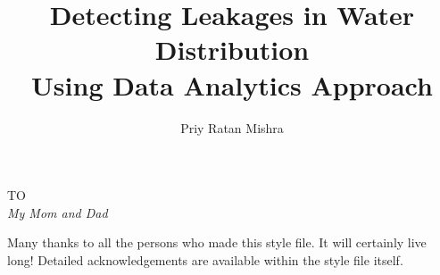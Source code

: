 \documentclass[12pt]{iiscthes}
\begin{document}
\begin{frontmatter}
%
%

\title{Detecting Leakages in Water Distribution\\ 
	Using Data Analytics Approach %
	\\
	}
\author{Priy Ratan Mishra}
\iisclogotrue %
\tablespagetrue %
\maketitle
\begin{dedication}
\begin{center}
TO \\[2em]
\large\it My Mom and Dad\\
\end{center}
\end{dedication}
\acknowledgements

Many thanks to all the persons who made this style file. It will certainly
live long! Detailed acknowledgements are available within the style file itself.


\end{frontmatter}
\end{document}
